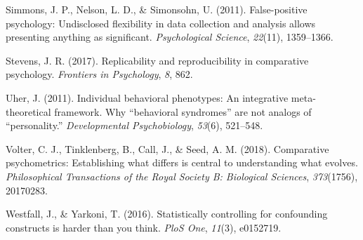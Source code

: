 \documentclass[10pt, letterpaper]{article}
\begin{document}
\leavevmode\hypertarget{ref-simmons2011false}{}%
Simmons, J. P., Nelson, L. D., \& Simonsohn, U. (2011). False-positive
psychology: Undisclosed flexibility in data collection and analysis
allows presenting anything as significant. \emph{Psychological Science},
\emph{22}(11), 1359--1366.

\leavevmode\hypertarget{ref-stevens2017replicability}{}%
Stevens, J. R. (2017). Replicability and reproducibility in comparative
psychology. \emph{Frontiers in Psychology}, \emph{8}, 862.

\leavevmode\hypertarget{ref-uher2011individual}{}%
Uher, J. (2011). Individual behavioral phenotypes: An integrative
meta-theoretical framework. Why {``behavioral syndromes''} are not
analogs of {``personality.''} \emph{Developmental Psychobiology},
\emph{53}(6), 521--548.

\leavevmode\hypertarget{ref-volter2018comparative}{}%
Volter, C. J., Tinklenberg, B., Call, J., \& Seed, A. M. (2018).
Comparative psychometrics: Establishing what differs is central to
understanding what evolves. \emph{Philosophical Transactions of the
Royal Society B: Biological Sciences}, \emph{373}(1756), 20170283.

\leavevmode\hypertarget{ref-westfall2016statistically}{}%
Westfall, J., \& Yarkoni, T. (2016). Statistically controlling for
confounding constructs is harder than you think. \emph{PloS One},
\emph{11}(3), e0152719.



\end{document}
